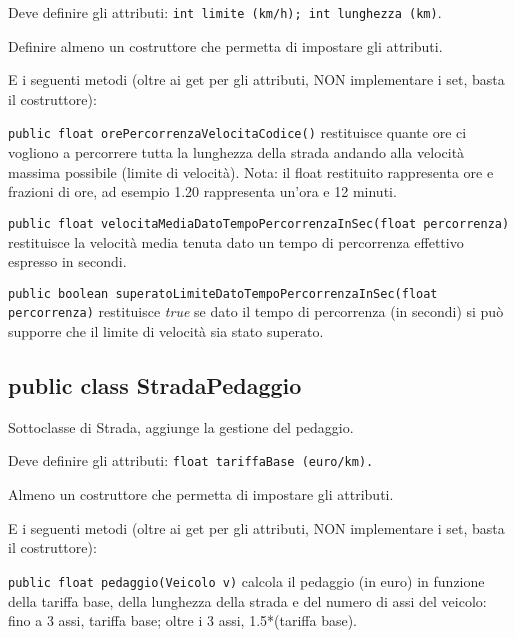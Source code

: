\documentclass[a4paper]{article}
\begin{document}
Deve definire gli attributi: \texttt{int limite (km/h); int lunghezza 
(km)}.

Definire almeno un costruttore che permetta di impostare gli attributi.

E i seguenti metodi (oltre ai get per gli attributi, NON implementare i set, 
basta il costruttore):

\begin{compactitem}

\item\texttt{public float orePercorrenzaVelocitaCodice()} restituisce quante 
ore ci vogliono a percorrere tutta la lunghezza della strada andando alla 
velocità massima possibile (limite di velocità). Nota: il float restituito rappresenta
ore e frazioni di ore, ad esempio 1.20 rappresenta un'ora e 12 minuti.

\item\texttt{public float velocitaMediaDatoTempoPercorrenzaInSec(float 
percorrenza)} restituisce la velocità media tenuta dato un tempo di percorrenza 
effettivo espresso in secondi.

\item\texttt{public boolean superatoLimiteDatoTempoPercorrenzaInSec(float 
percorrenza)} restituisce \textit{true} se dato il tempo di percorrenza (in secondi) si può 
supporre che il limite di velocità sia stato superato.

\end{compactitem}





\subsection*{public class StradaPedaggio}

Sottoclasse di Strada, aggiunge la gestione del pedaggio.

Deve definire gli attributi: \texttt{float tariffaBase (euro/km).}

Almeno un costruttore che permetta di impostare gli attributi.

E i seguenti metodi (oltre ai get per gli attributi, NON implementare i set, 
basta il costruttore):

\begin{compactitem}
\item \texttt{public float pedaggio(Veicolo v)} calcola il pedaggio (in euro) in funzione 
della tariffa base, della lunghezza della strada e del numero di assi del veicolo: fino a 3 assi, tariffa 
base; oltre i 3 assi, 1.5*(tariffa base).
\end{compactitem} 
\end{document}

